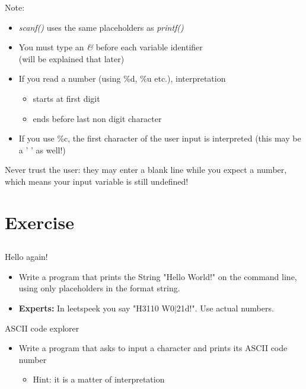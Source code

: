 \begin{frame}{Note:}
	\begin{itemize}
		\item \textit{scanf()} uses the same placeholders as \textit{printf()}
		\item You must type an \textit{\&} before each variable identifier \\
			(will be explained that later)
		\item If you read a number (using \%d, \%u etc.), interpretation
		\begin{itemize}
			\item starts at first digit
			\item ends before last non digit character
		\end{itemize}
		\item If you use \%c, the first character of the user input is interpreted (this may be a ' ' as well!)
	\end{itemize}
	Never trust the user: they may enter a blank line while you expect a number, which means your input variable is still undefined!
		
\end{frame}
\section{Exercise}
\subsection{}

\begin{frame}[fragile]{Hello again!}
	\begin{itemize}
	
		\item Write a program that prints the String "Hello World!" on the command line, using only placeholders in the format string.
		\item \textbf{Experts:} In leetspeek you say "H3110 W0$|$21d!". Use actual numbers.

	\end{itemize}
\end{frame}
\begin{frame}[fragile]{ASCII code explorer}
	\begin{itemize}
		\item Write a program that asks to input a character and prints its ASCII code number
		\begin{itemize}
			\item<2-> Hint: it is a matter of interpretation
		\end{itemize}

	\end{itemize}	
\end{frame}

